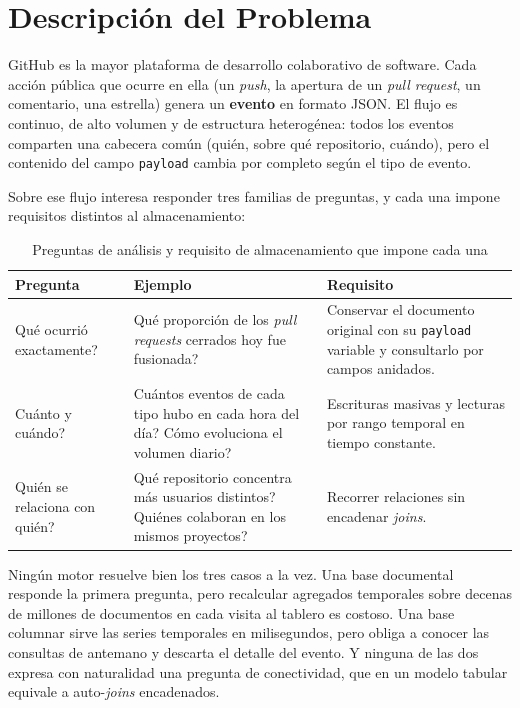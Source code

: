 \section{Descripción del Problema}
\label{sec:problema}

GitHub es la mayor plataforma de desarrollo colaborativo de software. Cada acción pública que ocurre en ella (un \textit{push}, la apertura de un \textit{pull request}, un comentario, una estrella) genera un \textbf{evento} en formato JSON. El flujo es continuo, de alto volumen y de estructura heterogénea: todos los eventos comparten una cabecera común (quién, sobre qué repositorio, cuándo), pero el contenido del campo \texttt{payload} cambia por completo según el tipo de evento.

Sobre ese flujo interesa responder tres familias de preguntas, y cada una impone requisitos distintos al almacenamiento:

\begin{table}[H]
\centering
\caption{Preguntas de análisis y requisito de almacenamiento que impone cada una}
\label{tab:preguntas}
\vspace{0.2cm}
\small
\begin{tabular}{@{}p{4.9cm}p{5.2cm}p{4.6cm}@{}}
\toprule
\textbf{Pregunta} & \textbf{Ejemplo} & \textbf{Requisito} \\
\midrule
\textquestiondown{}Qué ocurrió exactamente? &
\textquestiondown{}Qué proporción de los \textit{pull requests} cerrados hoy fue fusionada? &
Conservar el documento original con su \texttt{payload} variable y consultarlo por campos anidados. \\
\addlinespace
\textquestiondown{}Cuánto y cuándo? &
\textquestiondown{}Cuántos eventos de cada tipo hubo en cada hora del día? \textquestiondown{}Cómo evoluciona el volumen diario? &
Escrituras masivas y lecturas por rango temporal en tiempo constante. \\
\addlinespace
\textquestiondown{}Quién se relaciona con quién? &
\textquestiondown{}Qué repositorio concentra más usuarios distintos? \textquestiondown{}Quiénes colaboran en los mismos proyectos? &
Recorrer relaciones sin encadenar \textit{joins}. \\
\bottomrule
\end{tabular}
\end{table}

Ningún motor resuelve bien los tres casos a la vez. Una base documental responde la primera pregunta, pero recalcular agregados temporales sobre decenas de millones de documentos en cada visita al tablero es costoso. Una base columnar sirve las series temporales en milisegundos, pero obliga a conocer las consultas de antemano y descarta el detalle del evento. Y ninguna de las dos expresa con naturalidad una pregunta de conectividad, que en un modelo tabular equivale a auto-\textit{joins} encadenados.

